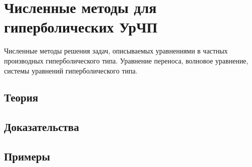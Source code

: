 
\section{Численные методы для гиперболических УрЧП}
\label{sec:2.1.13-fd-hyperbolic}

\begin{ticket}
Численные методы решения задач, описываемых уравнениями в частных производных гиперболического типа. Уравнение переноса, волновое уравнение, системы уравнений гиперболического типа.
\end{ticket}

\subsection*{Теория}

\subsection*{Доказательства}

\subsection*{Примеры}
